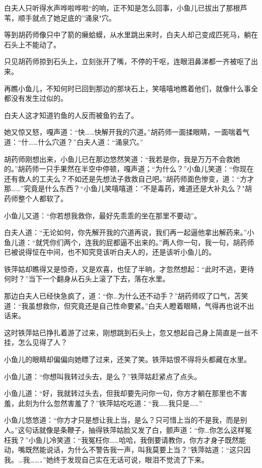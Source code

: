 \documentclass[12pt,oneside]{book}
\begin{document}
白夫人只听得水声哗啦哗啦``的响，正不知是怎么回事，小鱼儿已拔出了那根芦苇，顺手就点了她足底的''涌泉"穴。

等到胡药师像只中了箭的癞蛤蟆，从水里跳出来时，白夫人却己变成匹死马，躺在石头上不能动了。

只见胡药师掠到石头上，立刻张开了嘴，不停的干呕，连眼泪鼻涕都一齐被呕了出来。

再瞧小鱼儿，不知何时已回到那边的那块石上，笑嘻嘻地瞧着他们，就像什么事全都没有发生过似的。

白夫人这才知道钓鱼的人反而被鱼钓去了。

她又惊又怒，嘎声道：``快\ldots\ldots 快解开我的穴道。''胡药师一面揉眼睛，一面喘着气道：``什\ldots\ldots 什么穴道？''白夫人道：``涌泉穴。''

胡药师刚想出来，小鱼儿已在那边悠然笑道：``我若是你，我是万万不会救她的。''胡药师一只手果然在半空中停顿，嘎声道；``为什么？''小鱼儿笑道：``你现在还有救人的工夫么？不如还是先想法子救救自己吧。''胡药师面色惨变，道：``方才那\ldots\ldots{}''究竟是什么东西？``小鱼儿笑嘻嘻道：''不是毒药，难道还是大补丸么？"胡药师整个人都软了。

小鱼儿又道：``你若想我救你，最好先乖乖的坐在那里不要动''。

白夫人道：``无论如何，你先解开我的穴道再说，我们再一起逼他拿出解药来。''小鱼儿道：``就凭你们两个，连我的屁都逼不出来的。''两人你一句，我一句，胡药师已被说得怔在中间，也不知究竞该听白夫人的，还是该听小鱼儿的。

铁萍姑却瞧得又是惊奇，又是欢喜，也怔了半晌，才忽然想起：``此时不逃，更待何时？''当下一个翻身从石头上滚了下去，落在水里。

那边白夫人已经快急疯了，道：``你\ldots 为什么还不动手？''胡药师叹了口气，苫笑道：``我虽想救你，但究竟还是自己性命要紧。''白夫人瞪着眼睛，气得再也说不出话来。

这时铁萍姑已挣扎着游了过来，刚想跳到石头上，忽又想起自己身上简直是一丝不挂，怎么见得了人？

小鱼儿的眼睛却偏偏向她瞟了过来，还笑了笑。铁萍姑恨不得将头都藏在水里。

小鱼儿道：``你想叫我转过头去，是么？''铁萍姑赶紧点了点头。

小鱼儿道：``好，我就转过头去，但我却要先问你一句，你方才躺在那里也不害羞，此刻为什么忽然害羞了？''铁萍姑吃吃道：``我\ldots\ldots 我只是\ldots\ldots{}''

小鱼儿悠悠道：``你方才只是想让我上当，是么？只可惜上当的不是我，而是别人。''这句话就像是条鞭子，抽得铁萍姑脸又发了白，颤声道：``你\ldots 你怎么这样冤枉我？''小鱼儿冷笑道：``我冤枉你\ldots\ldots 哈哈，我倒要请教你，你方才身子既然能动，嘴既然能说话，为什么不警告我一声，叫我莫要上当？''铁萍姑道：``这只因我。\ldots 我\ldots\ldots．''她终于发现自己实在无话可说，眼泪不觉流了下来。
\end{document}
